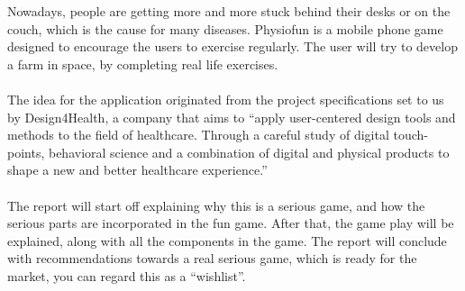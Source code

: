 Nowadays, people are getting more and more stuck behind their desks or on the couch, which is the cause for many diseases. Physiofun is a mobile phone game designed to encourage the users to exercise regularly. The user will try to develop a farm in space, by completing real life exercises.\\
\\
The idea for the application originated from the project specifications set to us by Design4Health, a company that aims to ``apply user-centered design tools and methods to the field of healthcare. Through a careful study of digital touch-points, behavioral science and a combination of digital and physical products to shape a new and better healthcare experience.''\\
\\
The report will start off explaining why this is a serious game, and how the serious parts are incorporated in the fun game. After that, the game play will be explained, along with all the components in the game. The report will conclude with recommendations towards a real serious game, which is ready for the market, you can regard this as a ``wishlist''.